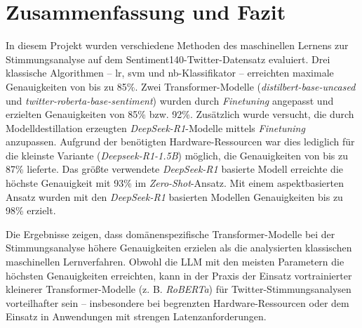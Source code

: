 \section{Zusammenfassung und Fazit}\label{sec:zusammenfassung-und-fazit}

In diesem Projekt wurden verschiedene Methoden des maschinellen Lernens zur Stimmungsanalyse auf dem Sentiment140-Twitter-Datensatz evaluiert.
Drei klassische Algorithmen – \gls{lr}, \gls{svm} und \gls{nb}-Klassifikator – erreichten maximale Genauigkeiten von bis zu 85\%.
Zwei Transformer-Modelle (\emph{distilbert-base-uncased} und \emph{twitter-roberta-base-sentiment}) wurden durch \textit{Finetuning} angepasst und erzielten Genauigkeiten von 85\% bzw. 92\%.
Zusätzlich wurde versucht, die durch Modelldestillation erzeugten \emph{DeepSeek-R1}-Modelle mittels \textit{Finetuning} anzupassen.
Aufgrund der benötigten Hardware-Res\-sour\-cen war dies lediglich für die kleinste Variante (\emph{Deepseek-R1-1.5B}) möglich, die Genauigkeiten von bis zu 87\% lieferte.
Das größte verwendete \emph{DeepSeek-R1} basierte Modell erreichte die höchste Genauigkeit mit 93\% im \textit{Zero-Shot}-Ansatz.
Mit einem aspektbasierten Ansatz wurden mit den \emph{DeepSeek-R1} basierten Modellen Genauigkeiten bis zu 98\% erzielt.

Die Ergebnisse zeigen, dass domänenspezifische Transformer-Modelle bei der Stimmungsanalyse höhere Genauigkeiten erzielen als die analysierten klassischen maschinellen Lernverfahren.
Obwohl die LLM mit den meisten Parametern die höchsten Genauigkeiten erreichten, kann in der Praxis der Einsatz vortrainierter kleinerer Transformer-Modelle (z. B. \emph{RoBERTa}) für Twitter-Stimmungsanalysen vorteilhafter sein – insbesondere bei begrenzten Hardware-Ressourcen oder dem Einsatz in Anwendungen mit strengen Latenzanforderungen.
